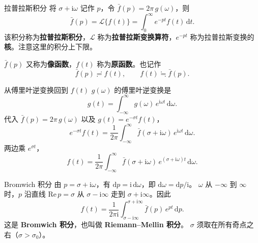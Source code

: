 \documentclass[fontset=windows, chinese, 10pt, xcolor=dvipsnames]{beamer}
\begin{document}
\begin{frame}{拉普拉斯积分}
  将 $\sigma+\mathrm{i}\omega$ 记作 $p$，令 $\bar f(p)=2\pi\,g(\omega)$，则
  \begin{equation*}
    \bar f(p)
    =\mathcal{L}\{f(t)\}
    =\int_0^{\infty} e^{-pt}f(t)\,\mathrm{d}t.
  \end{equation*}
  该积分称为\textbf{拉普拉斯积分}，$\mathcal{L}$ 称为\textbf{拉普拉斯变换算符}，$e^{-pt}$ 称为拉普拉斯变换的\textbf{核}。注意这里的积分上下限。
  \vspace{0.4em}

  $\bar f(p)$ 又称为\textbf{像函数}，$f(t)$ 称为\textbf{原函数}。也记作
  \begin{equation*}
    \bar f(p)\risingdotseq f(t),
    \qquad
    f(t)\fallingdotseq\bar f(p).
  \end{equation*}
\end{frame}

\begin{frame}{从傅里叶逆变换回到 $f(t)$}
  $g(\omega)$ 的傅里叶逆变换是
  \begin{equation*}
    g(t)=\int_{-\infty}^{\infty} g(\omega)\,e^{\mathrm{i}\omega t}\,\mathrm{d}\omega.
  \end{equation*}
  代入 $\bar f(p)=2\pi\,g(\omega)$ 以及 $g(t)=e^{-\sigma t}f(t)$，
  \begin{equation*}
    e^{-\sigma t}f(t)
    =\frac{1}{2\pi}\int_{-\infty}^{\infty}
      \bar f(\sigma+\mathrm{i}\omega)\,e^{\mathrm{i}\omega t}\,\mathrm{d}\omega.
  \end{equation*}
  两边乘 $e^{\sigma t}$，
  \begin{equation*}
    f(t)
    =\frac{1}{2\pi}\int_{-\infty}^{\infty}
      \bar f(\sigma+\mathrm{i}\omega)\,
      e^{(\sigma+\mathrm{i}\omega)t}\,\mathrm{d}\omega.
  \end{equation*}
\end{frame}

\begin{frame}{Bromwich 积分}
  由 $p=\sigma+\mathrm{i}\omega$，有 $\mathrm{d}p=\mathrm{i}\,\mathrm{d}\omega$，即
  $\mathrm{d}\omega=\mathrm{d}p/\mathrm{i}$。
  $\omega$ 从 $-\infty$ 到 $\infty$ 时，$p$ 沿直线 $\mathrm{Re}\,p=\sigma$
  从 $\sigma-\mathrm{i}\infty$ 走到 $\sigma+\mathrm{i}\infty$。因此
  \begin{equation*}
    f(t)
    =\frac{1}{2\pi\mathrm{i}}
      \int_{\sigma-\mathrm{i}\infty}^{\sigma+\mathrm{i}\infty}
      \bar f(p)\,e^{pt}\,\mathrm{d}p.
  \end{equation*}
  这是 \textbf{Bromwich 积分}，也叫做 \textbf{Riemann--Mellin 积分}。
  $\sigma$ 须取在所有奇点之右（$\sigma>\sigma_0$）。
\end{frame}
\end{document}
